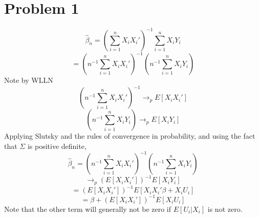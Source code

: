 \documentclass[10pt,letter]{article}
\begin{document}
\section*{Problem 1}
\[ \hat{\beta}_n = \left(\sum_{i=1}^n X_iX_i' \right)^{-1} \sum_{i=1}^n X_iY_i \]
\[ = \left(n^{-1}\sum_{i=1}^n X_iX_i' \right)^{-1} \left (n^{-1} \sum_{i=1}^n X_iY_i \right) \]
Note by WLLN
\[ \left(n^{-1}\sum_{i=1}^n X_iX_i' \right)^{-1} \to_p E[X_iX_i'] \]
\[ \left (n^{-1} \sum_{i=1}^n X_iY_i \right) \to_p E[X_i Y_i]\]
Applying Slutsky and the rules of convergence in probability, and using the fact that $\Sigma$ is positive definite,
\[ \hat{\beta}_n = \left(n^{-1}\sum_{i=1}^n X_iX_i' \right)^{-1} \left (n^{-1} \sum_{i=1}^n X_iY_i \right) \]
\[ \to_p (E[X_iX_i'])^{-1} E[X_i Y_i] \]
\[ = (E[X_iX_i'])^{-1} E[X_i X_i' \beta + X_i U_i] \]
\[ = \beta + (E[X_iX_i'])^{-1}  E[X_i U_i] \]
Note that the other term will generally not be zero if $E[U_i |X_i]$ is not zero.
\end{document}
